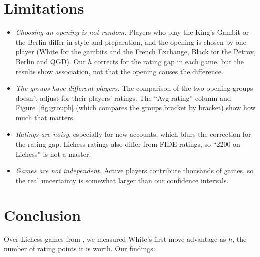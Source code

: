 \documentclass[11pt,a4paper]{article}
\begin{document}
\section*{Limitations}
\begin{itemize}
\item \emph{Choosing an opening is not random.} Players who play the King's Gambit or the
  Berlin differ in style and preparation, and the opening is chosen by one player (White for
  the gambits and the French Exchange, Black for the Petrov, Berlin and QGD). Our $h$
  corrects for the rating gap in each game, but the results show association, not that the
  opening causes the difference.
\item \emph{The groups have different players.} The comparison of the two opening groups doesn't
  adjust for their players' ratings. The ``Avg rating'' column and Figure~\ref{fig:grouph}
  (which compares the groups bracket by bracket) show how much that matters.
\item \emph{Ratings are noisy}, especially for new accounts, which blurs the correction for the
  rating gap. Lichess ratings also differ from FIDE ratings, so ``2200 on Lichess'' is not a
  master.
\item \emph{Games are not independent.} Active players contribute thousands of games, so the
  real uncertainty is somewhat larger than our confidence intervals.
\end{itemize}


\section*{Conclusion}
Over \GamesUsed{} Lichess games from \MonthList{}, we measured White's first-move advantage as $h$, the number of rating points it is worth. Our findings:
\end{document}
